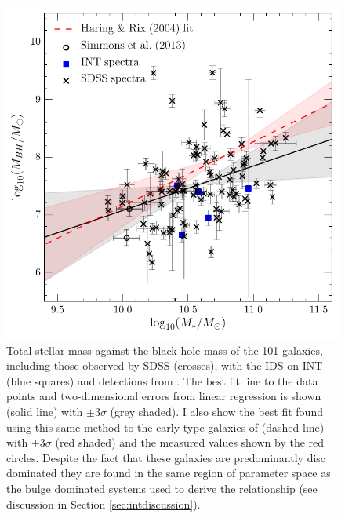 {\begin{figure}
\centering
\includegraphics[width=\textwidth]{agn/mass_bh_total_mass_fit_linmix_fit.pdf}
\caption[Black hole stellar mass relation for the \textsc{bulgeless} sample]{Total stellar mass against the black hole mass of the 101 galaxies, including those observed by SDSS (crosses), with the IDS on INT (blue squares) and detections from \citet[open cirlces]{Simmons13}. The best fit line to the data points and two-dimensional errors from linear regression is shown (solid line) with $\pm3\sigma$ (grey shaded). I also show the best fit found using this same method to the early-type galaxies of \citet{haringrix04} (dashed line) with $\pm3\sigma$ (red shaded) and the measured values shown by the red circles. Despite the fact that these galaxies are predominantly disc dominated they are found in the same region of parameter space as the bulge dominated systems used to derive the \citet{haringrix04} relationship (see discussion in Section \ref{sec:intdiscussion}).
}
\label{fig:totvsbh}
\end{figure}

}
